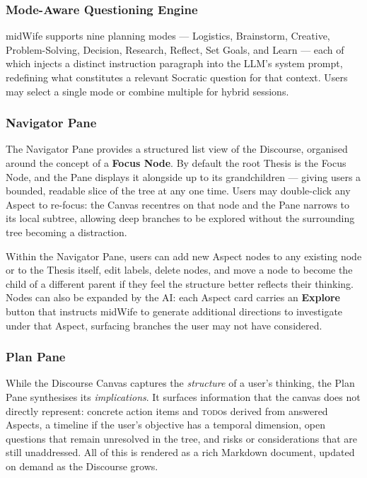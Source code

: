 \documentclass[sigconf]{acmart}
\begin{document}
\subsubsection{Mode-Aware Questioning Engine}

midWife supports nine planning modes --- Logistics, Brainstorm, Creative,
Problem-Solving, Decision, Research, Reflect, Set Goals, and Learn --- each of which
injects a distinct instruction paragraph into the LLM's system prompt, redefining what
constitutes a relevant Socratic question for that context. Users may select a single
mode or combine multiple for hybrid sessions.

\subsubsection{Navigator Pane}

The Navigator Pane provides a structured list view of the Discourse, organised around
the concept of a \textbf{Focus Node}. By default the root Thesis is the Focus Node, and
the Pane displays it alongside up to its grandchildren --- giving users a bounded,
readable slice of the tree at any one time. Users may double-click any Aspect to
re-focus: the Canvas recentres on that node and the Pane narrows to its local subtree,
allowing deep branches to be explored without the surrounding tree becoming a distraction.

Within the Navigator Pane, users can add new Aspect nodes to any existing node or to the
Thesis itself, edit labels, delete nodes, and move a node to become the child of a
different parent if they feel the structure better reflects their thinking. Nodes can also
be expanded by the AI: each Aspect card carries an \textbf{Explore} button that instructs
midWife to generate additional directions to investigate under that Aspect, surfacing
branches the user may not have considered.

\subsubsection{Plan Pane}

While the Discourse Canvas captures the \textit{structure} of a user's thinking, the
Plan Pane synthesises its \textit{implications}. It surfaces information that the canvas
does not directly represent: concrete action items and \textsc{todo}s derived from
answered Aspects, a timeline if the user's objective has a temporal dimension,
open questions that remain unresolved in the tree, and risks or considerations that are
still unaddressed. All of this is rendered as a rich Markdown document, updated on demand
as the Discourse grows.
\end{document}
